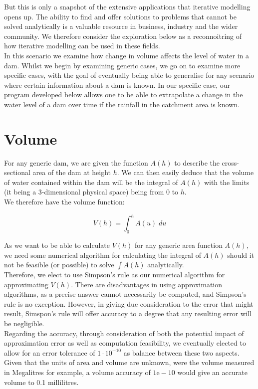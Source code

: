 \documentclass[a4paper, 11pt, oneside]{article}
\begin{document}
But this is only a snapshot of the extensive applications that iterative modelling opens up.
The ability to find and offer solutions to problems that cannot be solved analytically is a valuable resource in business, industry and the wider community.  We therefore consider the 
exploration below as a reconnoitring of how iterative modelling can be used in these fields.\\

In this scenario we examine how change in volume affects the level of water in a dam. Whilst we begin by examining generic cases, we go on to examine more specific cases, with the goal of eventually being able to generalise for any scenario where certain information about a dam is known. In our specific case, our program developed below allows one to be able to extrapolate a change in the water level of a dam over time if the rainfall in the catchment area is known.

\section{Volume}

For any generic dam, we are given the function $A(h)$ to describe the cross-sectional area of the dam at height $h$.  We can then easily deduce that the volume of water contained within the dam
will be the integral of $A(h)$ with the limits (it being a 3-dimensional physical space) being from $0$ to $h$.  \\

We therefore have the volume function:

$$V(h) = \int_0^h A(u) \; du$$

As we want to be able to calculate $V(h)$ for any generic area function $A(h)$, we need some numerical algorithm for calculating the integral of $A(h)$ should it not be feasible (or possible) to solve $\int A(h)$ analytically.\\

Therefore, we elect to use Simpson's rule as our numerical algorithm for approximating $V(h)$. There are disadvantages in using approximation algorithms, as a precise answer cannot necessarily be computed, and Simpson's rule is no exception. However, in giving due consideration to the error that might result, Simspon’s rule will offer accuracy to a degree that any resulting error will be negligible.\\

Regarding the accuracy, through consideration of both the potential impact of approximation error as well as computation feasibility, we eventually elected to allow for an error tolerance of $1 \cdot 10^{-10}$ as balance between these two aspects.  Given that the units of area and volume are unknown, were the volume measured in Megalitres for example, a volume accuracy of $1\text{e}-10$ would give an accurate volume to 0.1 millilitres.  \\
\end{document}
